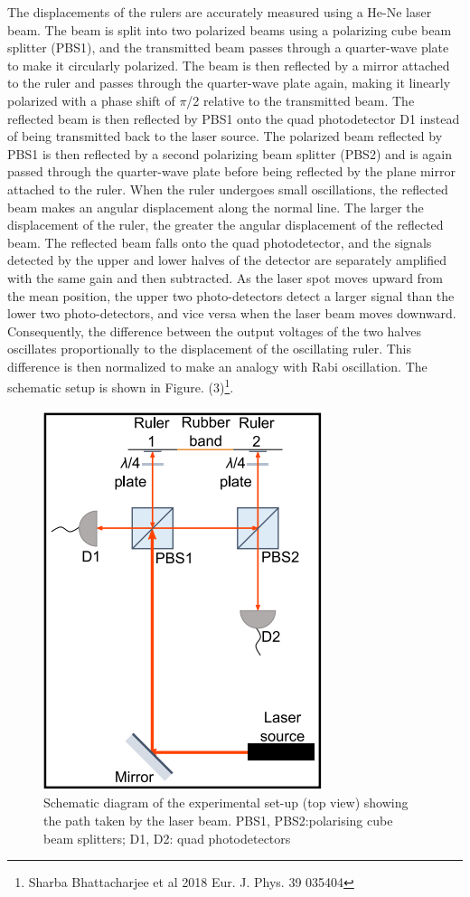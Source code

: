 The displacements of the rulers are accurately measured using a He-Ne laser beam. The beam is split into two polarized beams using a polarizing cube beam splitter (PBS1), and the transmitted beam passes through a quarter-wave plate to make it circularly polarized. The beam is then reflected by a mirror attached to the ruler and passes through the quarter-wave plate again, making it linearly polarized with a phase shift of $\pi$/2 relative to the transmitted beam. The reflected beam is then reflected by PBS1 onto the quad photodetector D1 instead of being transmitted back to the laser source. The polarized beam reflected by PBS1 is then reflected by a second polarizing beam splitter (PBS2) and is again passed through the quarter-wave plate before being reflected by the plane mirror attached to the ruler. When the ruler undergoes small oscillations, the reflected beam makes an angular displacement along the normal line. The larger the displacement of the ruler, the greater the angular displacement of the reflected beam. The reflected beam falls onto the quad photodetector, and the signals detected by the upper and lower halves of the detector are separately amplified with the same gain and then subtracted. As the laser spot moves upward from the mean position, the upper two photo-detectors detect a larger signal than the lower two photo-detectors, and vice versa when the laser beam moves downward. Consequently, the difference between the output voltages of the two halves oscillates proportionally to the displacement of the oscillating ruler. This difference is then normalized to make an analogy with Rabi oscillation. The schematic setup is shown in Figure. (3)\footnote{Sharba Bhattacharjee et al 2018 Eur. J. Phys. 39 035404}.
\begin{figure}[H]
	\centering
	\includegraphics[scale=0.8]{setup diagram.png}
	\caption{ Schematic diagram of the
		experimental set-up (top view) showing the path taken by the laser beam. PBS1, PBS2:polarising cube beam splitters; D1, D2: quad photodetectors}
	\label{fig:mb-fe-0}
\end{figure}
